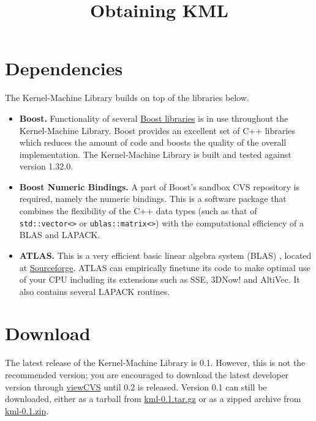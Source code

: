 \documentclass{article}
\begin{document}
\title{Obtaining KML}
\maketitle

\section*{Dependencies}

The Kernel-Machine Library builds on top of the libraries below.

\begin{itemize}
\item \textbf{Boost.} Functionality of several \href{http://www.boost.org}{Boost libraries} is 
in use throughout the Kernel-Machine Library. Boost provides
an excellent set of C++ libraries which reduces the amount of code and boosts the quality of the overall implementation.
The Kernel-Machine Library is built and tested against version 1.32.0.

\item \textbf{Boost Numeric Bindings.} A part of Boost's sandbox CVS repository is required, namely the numeric bindings. 
This is a software package that combines the flexibility of the C++ data types (such as that of 
\texttt{std::vector<>} or \texttt{ublas::matrix<>}) with the computational 
efficiency of a BLAS and LAPACK.  

\item \textbf{ATLAS.} This is a very efficient basic linear algebra system (BLAS) \citep{whaley01automated}, located at
\href{http://math-atlas.sourceforge.net}{Sourceforge}. ATLAS can empirically finetune its code to make optimal use of your CPU 
including its extensions such as SSE, 3DNow! and AltiVec. It also contains several LAPACK routines. 

\end{itemize}

\section*{Download}
\label{section:download}

The latest release of the Kernel-Machine Library is 0.1. However, this is not the recommended version; you are encouraged to
download the latest developer version through  
\href{http://www.terborg.net/cgi-bin/viewcvs.cgi/trunk/kml/}{viewCVS} until 0.2 is released. 
Version 0.1 can still be downloaded, either as a tarball 
from \href{research/kml/kml-0.1.tar.gz}{kml-0.1.tar.gz} or as a zipped archive
from \href{research/kml/kml-0.1.zip}{kml-0.1.zip}.
\end{document}
